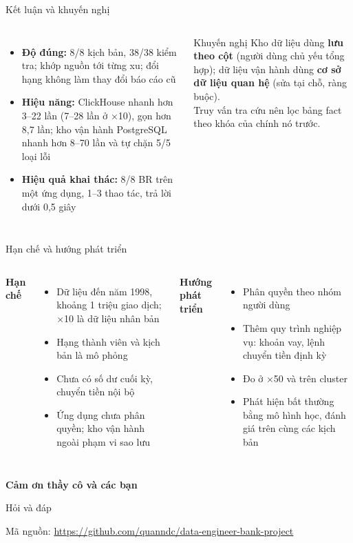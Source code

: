 \documentclass[aspectratio=169,11pt]{beamer}
\begin{document}
\begin{frame}{Kết luận và khuyến nghị}
  \begin{columns}[T]
    \small
    \begin{itemize}
      \item \textbf{Độ đúng:} 8/8 kịch bản, 38/38 kiểm tra; khớp nguồn tới từng xu; đổi hạng không làm thay đổi báo cáo cũ
      \item \textbf{Hiệu năng:} ClickHouse nhanh hơn 3--22 lần (7--28 lần ở ×10), gọn hơn 8,7 lần; kho vận hành PostgreSQL nhanh hơn 8--70 lần và tự chặn 5/5 loại lỗi
      \item \textbf{Hiệu quả khai thác:} 8/8 BR trên một ứng dụng, 1--3 thao tác, trả lời dưới 0,5 giây
    \end{itemize}
    \begin{block}{Khuyến nghị}
      \small Kho dữ liệu dùng \textbf{lưu theo cột} (người dùng chủ yếu tổng hợp); dữ liệu vận hành dùng \textbf{cơ sở dữ liệu quan hệ} (sửa tại chỗ, ràng buộc).\\[4pt]
      Truy vấn tra cứu nên lọc bảng fact theo khóa của chính nó trước.
    \end{block}
  \end{columns}
\end{frame}

\begin{frame}{Hạn chế và hướng phát triển}
  \begin{columns}[T]
    \textbf{Hạn chế}
    \small
    \begin{itemize}
      \item Dữ liệu đến năm 1998, khoảng 1 triệu giao dịch; ×10 là dữ liệu nhân bản
      \item Hạng thành viên và kịch bản là mô phỏng
      \item Chưa có số dư cuối kỳ, chuyển tiền nội bộ
      \item Ứng dụng chưa phân quyền; kho vận hành ngoài phạm vi sao lưu
    \end{itemize}
    \textbf{Hướng phát triển}
    \small
    \begin{itemize}
      \item Phân quyền theo nhóm người dùng
      \item Thêm quy trình nghiệp vụ: khoản vay, lệnh chuyển tiền định kỳ
      \item Đo ở ×50 và trên cluster
      \item Phát hiện bất thường bằng mô hình học, đánh giá trên cùng các kịch bản
    \end{itemize}
  \end{columns}
\end{frame}

\begin{frame}[plain]
  \centering
  \vfill
  {\color{navy}\Huge\bfseries Cảm ơn thầy cô và các bạn}\par\bigskip
  {\Large Hỏi và đáp}\par\vfill
  \footnotesize Mã nguồn: \url{https://github.com/quanndc/data-engineer-bank-project}
\end{frame}
\end{document}
